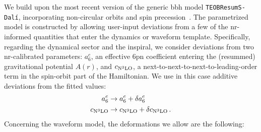 \documentclass[prd,amssymb,amsmath,amsfonts,nofootinbib,reprint,showpacs,longbibliography]{revtex4-1}
\def\TEOBResumSDali{\texttt{TEOBResumS-Dalí}}
\def\c3{c_{\rm{N}^3\rm{LO}}}
\begin{document}
We build upon the most recent version of the generic \ac{bbh} model \TEOBResumSDali, incorporating non-circular
orbits and spin precession~\cite{Nagar:2024oyk, Gamba:2024cvy, Albanesi:2025txj}. The parametrized model is constructed by
allowing user-input deviations from a few of the \ac{nr}-informed quantities that enter the dynamics or waveform
template. Specifically, regarding the dynamical sector and the inspiral, we consider deviations from two
\ac{nr}-calibrated parameters: $a_6^c$, an effective 6\ac{pn} coefficient entering the (resummed) gravitational
potential $A(r)$, and $c_{\rm{N}^3\rm{LO}}$, a next-to-next-to-next-to-leading-order term in the spin-orbit
part of the Hamiltonian. We use in this case additive deviations from the fitted values:
\begin{subequations}
\begin{align}
a_6^c &\rightarrow a_6^c + \delta a_6^c \\
\c3 &\rightarrow \c3 + \delta \c3 \, .
\end{align}
\end{subequations}
Concerning the waveform model, the deformations we allow are the following:
\end{document}
